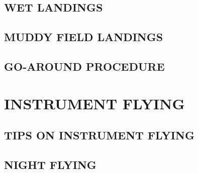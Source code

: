 \subsection{WET LANDINGS}
\subsection{MUDDY FIELD LANDINGS}
\subsection{GO-AROUND PROCEDURE}

\section{INSTRUMENT FLYING}
\subsection{TIPS ON INSTRUMENT FLYING}
\subsection{NIGHT FLYING}


\cleardoublepage